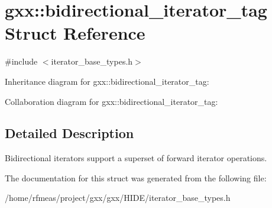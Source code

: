 \hypertarget{structgxx_1_1bidirectional__iterator__tag}{}\section{gxx\+:\+:bidirectional\+\_\+iterator\+\_\+tag Struct Reference}
\label{structgxx_1_1bidirectional__iterator__tag}


{\ttfamily \#include $<$iterator\+\_\+base\+\_\+types.\+h$>$}



Inheritance diagram for gxx\+:\+:bidirectional\+\_\+iterator\+\_\+tag\+:


Collaboration diagram for gxx\+:\+:bidirectional\+\_\+iterator\+\_\+tag\+:


\subsection{Detailed Description}
Bidirectional iterators support a superset of forward iterator operations. 

The documentation for this struct was generated from the following file\+:\begin{DoxyCompactItemize}
\item 
/home/rfmeas/project/gxx/gxx/\+H\+I\+D\+E/iterator\+\_\+base\+\_\+types.\+h\end{DoxyCompactItemize}
